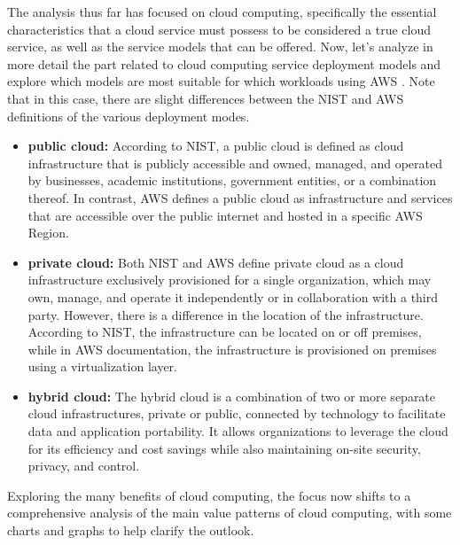 The analysis thus far has focused on cloud computing, specifically the essential characteristics that a cloud service must possess to be considered a true cloud service, as well as the service models that can be offered. Now, let's analyze in more detail the part related to cloud computing service deployment models and explore which models are most suitable for which workloads using AWS \cite{AWSPrivatePublicHybrid}. Note that in this case, there are slight differences between the NIST and AWS definitions of the various deployment modes.
\begin{itemize}
    \item \textbf{public cloud: } According to NIST, a public cloud is defined as cloud infrastructure that is publicly accessible and owned, managed, and operated by businesses, academic institutions, government entities, or a combination thereof. In contrast, AWS defines a public cloud as infrastructure and services that are accessible over the public internet and hosted in a specific AWS Region.
    \item \textbf{private cloud: } Both NIST and AWS define private cloud as a cloud infrastructure exclusively provisioned for a single organization, which may own, manage, and operate it independently or in collaboration with a third party. However, there is a difference in the location of the infrastructure. According to NIST, the infrastructure can be located on or off premises, while in AWS documentation, the infrastructure is provisioned on premises using a virtualization layer.
    \item \textbf{hybrid cloud: } The hybrid cloud is a combination of two or more separate cloud infrastructures, private or public, connected by technology to facilitate data and application portability. It allows organizations to leverage the cloud for its efficiency and cost savings while also maintaining on-site security, privacy, and control.
\end{itemize}

Exploring the many benefits of cloud computing, the focus now shifts to a comprehensive analysis of the main value patterns of cloud computing, with some charts and graphs to help clarify the outlook.

